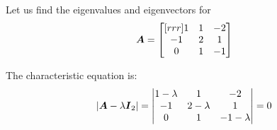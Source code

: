 \documentclass{beamer}
\begin{document}
\begin{frame}
\begin{example}
Let us find the eigenvalues and eigenvectors for
\begin{equation*}
\boldsymbol{A}=
\begin{bmatrix}[rrr]
1 & 1 & -2 \\
-1 & 2 & 1 \\
0 & 1 & -1 \\
\end{bmatrix}
\end{equation*}
\begin{overprint}
The characteristic equation is:
\begin{equation*}
{\left\lvert \boldsymbol{A}-\lambda\boldsymbol{I}_{2}\right\rvert}=
\begin{vmatrix}
1-\lambda & 1 & -2 \\
-1 & 2-\lambda & 1 \\
0 & 1 & -1-\lambda \\
\end{vmatrix}=0
\end{equation*}


\end{overprint}
\end{example}
\end{frame}
\end{document}
